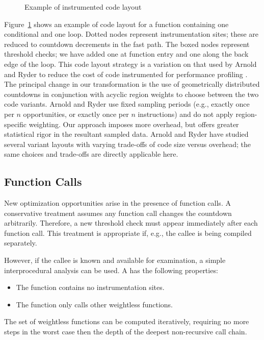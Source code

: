 \begin{figure}
  \centering
  
  \caption{Example of instrumented code layout}
  \label{fig:code-layout}
\end{figure}

Figure~\ref{fig:code-layout} shows an example of code layout for a
function containing one conditional and one loop.  Dotted nodes
represent instrumentation sites; these are reduced to countdown
decrements in the fast path.  The boxed nodes represent threshold
checks; we have added one at function entry and one along the back
edge of the loop.  This code layout strategy is a variation on that
used by Arnold and Ryder to reduce the cost of code instrumented for
performance profiling \cite{Arnold:2001:FRC}.  The principal change in
our transformation is the use of geometrically distributed countdowns
in conjunction with acyclic region weights to choose between the two
code variants.  Arnold and Ryder use fixed sampling periods (e.g.,
exactly once per $n$ opportunities, or exactly once per $n$
instructions) and do not apply region-specific weighting.  Our
approach imposes more overhead, but offers greater statistical rigor
in the resultant sampled data.  Arnold and Ryder have studied several
variant layouts with varying trade-offs of code size versus overhead;
the same choices and trade-offs are directly applicable here.

\subsection{Function Calls}

New optimization opportunities arise in the presence of function
calls.  A conservative treatment assumes any function call changes the
countdown arbitrarily.  Therefore, a new threshold check must appear
immediately after each function call.  This treatment is appropriate
if, e.g., the callee is being compiled separately.

However, if the callee is known and available for examination, a
simple interprocedural analysis can be used.  A  has the following properties:

\begin{itemize}
\item The function contains no instrumentation sites.
\item The function only calls other weightless functions.
\end{itemize}

The set of weightless functions can be computed iteratively, requiring
no more steps in the worst case then the depth of the deepest
non-recursive call chain.

